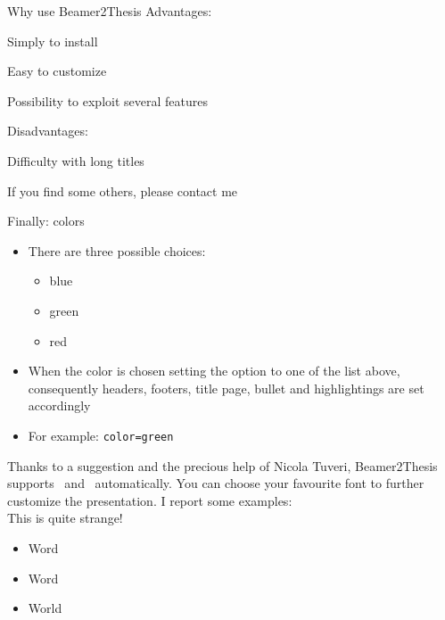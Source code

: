 \begin{tframe}{Why use Beamer2Thesis}
Advantages:
\begin{adv}
\item Simply to install
\item Easy to customize
\item Possibility to exploit several features
\end{adv}
Disadvantages:
\begin{disadv}
\item Difficulty with long titles
\item If you find some others, please contact me 
\end{disadv}

\end{tframe}

\begin{frame}[t,fragile]{Finally: colors}
\begin{itemize}
\item There are three possible choices:
\begin{itemize}
\item blue
\item green
\item red
\end{itemize}
\item When the color is chosen setting the option  to one of the list above, consequently headers, footers, title page, bullet and highlightings are set accordingly
\item For example: \verb!color=green!
\end{itemize}
\end{frame}

\begin{tframe}{\XeLaTeX}
Thanks to a suggestion and the precious help of Nicola Tuveri, Beamer2Thesis supports \XeTeX\, and \XeLaTeX\, automatically.
You can choose your favourite font to further customize the presentation. I report some examples:\\
\fontsize{12pt}{18pt}\selectfont This is quite strange! 
\selectfont{Also this is strange}\\
\selectfont{How to customize fonts?}\par
\begin{itemize}
\item {\LARGE Word}
\item Word
\item {\tiny World}
\end{itemize}
\end{tframe}

